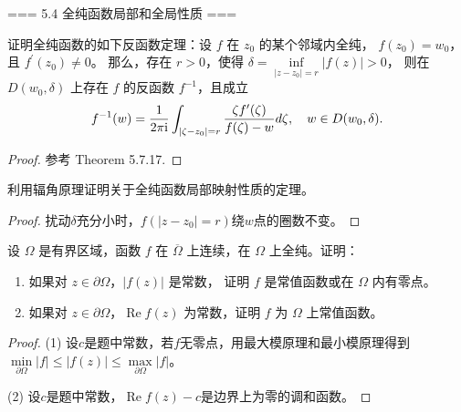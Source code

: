=== 5.4 全纯函数局部和全局性质 ===
\begin{1}
    证明全纯函数的如下反函数定理：设 $f$ 在 $z_0$ 的某个邻域内全纯，
    $f(z_0)=w_0$，且 $f^{\prime}(z_0) \neq 0$。
    那么，存在 $r>0$，使得 $\delta=\inf\limits_{|z-z_0|=r}|f(z)|>0$，
    则在 $D(w_0,\delta)$ 上存在 $f$ 的反函数 $f^{-1}$，且成立
    $$f^{-1}(w)=\frac{1}{2\pi{\rm i}} \int_{|\zeta-z_0|=r} \frac{\zeta f^{\prime}(\zeta)}{f(\zeta)-w} d\zeta, \quad w \in D(w_0, \delta).$$
\end{1}
\begin{proof}
    参考\cite{AG} Theorem 5.7.17.
\end{proof}

\begin{2}
    利用辐角原理证明关于全纯函数局部映射性质的定理。
\end{2}
\begin{proof}
    扰动$\delta$充分小时，$f(|z-z_0|=r)$绕$w$点的圈数不变。
\end{proof}

\begin{3}
    设 $\Omega$ 是有界区域，函数 $f$ 在 $\overline{\Omega}$ 上连续，在 $\Omega$ 上全纯。证明：
    \begin{enumerate}[label=(\arabic*)]
    \item 如果对 $z \in \partial \Omega$，$|f(z)|$ 是常数，
    证明 $f$ 是常值函数或在 $\Omega$ 内有零点。
    \item 如果对 $z \in \partial \Omega$，$\operatorname{Re} f(z)$ 为常数，证明 $f$ 为 $\Omega$ 上常值函数。
\end{enumerate}
\end{3}
\begin{proof}
    (1) 设$c$是题中常数，若$f$无零点，用最大模原理和最小模原理得到
    $\min\limits_{\partial\Omega}|f|\le|f(z)|\le\max\limits_{\partial\Omega}|f|$。

    (2) 设$c$是题中常数，$\operatorname{Re} f(z)-c$是边界上为零的调和函数。
\end{proof}

